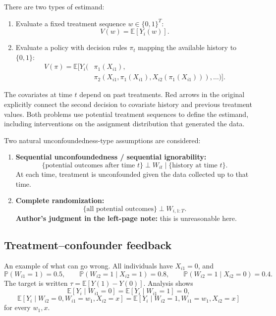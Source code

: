 There are two types of estimand:
\begin{enumerate}
 \item Evaluate a fixed treatment sequence $w\in\{0,1\}^T$:
 \[V(w)=\mathbb E[Y_i(w)].\]
 \item Evaluate a policy with decision rules $\pi_t$ mapping the available history to $\{0,1\}$:
 \begin{align*}
 V(\pi)=\mathbb E\bigl[Y_i\bigl(&\pi_1(X_{i1}),\\
 &\pi_2(X_{i1},\pi_1(X_{i1}),X_{i2}(\pi_1(X_{i1}))),\ldots\bigr)\bigr].\tag{12.2}
 \end{align*}
\end{enumerate}
The covariates at time $t$ depend on past treatments. Red arrows in the original explicitly connect the second decision to covariate history and previous treatment values. Both problems use potential treatment sequences to define the estimand, including interventions on the assignment distribution that generated the data.

Two natural unconfoundedness-type assumptions are considered:
\begin{enumerate}
 \item \textbf{Sequential unconfoundedness / sequential ignorability:}
 \[
 \{\text{potential outcomes after time }t\}\perp W_{it}
 \mid\{\text{history at time }t\}.
 \]
 At each time, treatment is unconfounded given the data collected up to that time.
 \item \textbf{Complete randomization:}
 \[\{\text{all potential outcomes}\}\perp W_{i,1:T}.\]
 \textbf{Author's judgment in the left-page note:} this is unreasonable here.
\end{enumerate}

\subsection{Treatment--confounder feedback}
An example of what can go wrong. All individuals have $X_{i1}=0$, and
\[
 \mathbb P(W_{i1}=1)=0.5,\qquad
 \mathbb P(W_{i2}=1\mid X_{i2}=1)=0.8,\qquad
 \mathbb P(W_{i2}=1\mid X_{i2}=0)=0.4.
\]
The target is written $\tau=\mathbb E[Y(1)-Y(0)]$. Analysis shows
\[
 \mathbb E[Y_i\mid W_{i1}=0]=\mathbb E[Y_i\mid W_{i1}=1]=0,
\]
\[
 \mathbb E[Y_i\mid W_{i2}=0,W_{i1}=w_1,X_{i2}=x]
 =\mathbb E[Y_i\mid W_{i2}=1,W_{i1}=w_1,X_{i2}=x]
\]
for every $w_1,x$.

